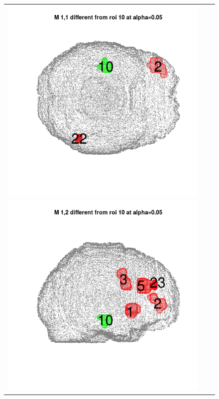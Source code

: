 \documentclass[12pt]{article}
\begin{document}
\begin{figure}[h]
\begin{tabular}{ccc}
\includegraphics[scale = 0.24]{../a7plots/d_1r_10_view3.png} \\ 
\includegraphics[scale = 0.24]{../a7plots/d_2r_10_view1.png} & 

\end{tabular}
\end{figure}
\end{document}
